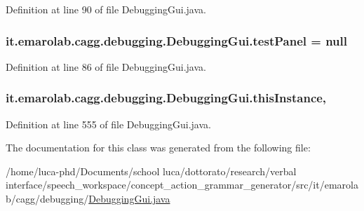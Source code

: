 Definition at line 90 of file Debugging\-Gui.\-java.

\hypertarget{classit_1_1emarolab_1_1cagg_1_1debugging_1_1DebuggingGui_a6c46d4da282f798650a68c5f638123ce}{
\subsubsection[{test\-Panel}]{ it.\-emarolab.\-cagg.\-debugging.\-Debugging\-Gui.\-test\-Panel = null\hspace{0.3cm}{\ttfamily [private]}}}\label{classit_1_1emarolab_1_1cagg_1_1debugging_1_1DebuggingGui_a6c46d4da282f798650a68c5f638123ce}


Definition at line 86 of file Debugging\-Gui.\-java.

\hypertarget{classit_1_1emarolab_1_1cagg_1_1debugging_1_1DebuggingGui_a9acdcdcb31dcfc0a1d1eca767a953620}{
\subsubsection[{this\-Instance}]{ it.\-emarolab.\-cagg.\-debugging.\-Debugging\-Gui.\-this\-Instance\hspace{0.3cm}{\ttfamily [static]}, {\ttfamily [private]}}}\label{classit_1_1emarolab_1_1cagg_1_1debugging_1_1DebuggingGui_a9acdcdcb31dcfc0a1d1eca767a953620}


Definition at line 555 of file Debugging\-Gui.\-java.



The documentation for this class was generated from the following file\-:\begin{DoxyCompactItemize}
\item 
/home/luca-\/phd/\-Documents/school luca/dottorato/research/verbal interface/speech\-\_\-workspace/concept\-\_\-action\-\_\-grammar\-\_\-generator/src/it/emarolab/cagg/debugging/\hyperlink{DebuggingGui_8java}{Debugging\-Gui.\-java}\end{DoxyCompactItemize}
